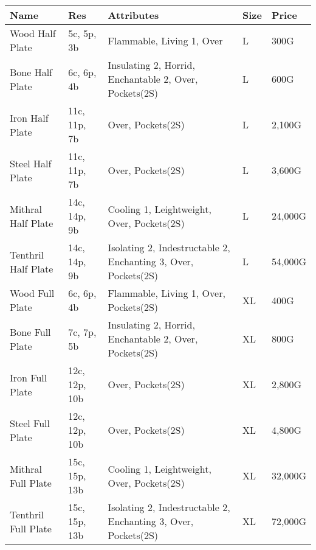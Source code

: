 \begin{longtable}{p{3cm} | p{1.5cm} | p{5cm} | p{1cm} | p{1.5cm}}
	Name & Res &  Attributes & Size & Price\\ \hline
	Wood Half Plate  & 5c, 5p, 3b & Flammable, Living 1, Over & L & 300G\\

	Bone Half Plate  & 6c, 6p, 4b & Insulating 2, Horrid, Enchantable 2, Over, Pockets(2S) & L & 600G\\

	Iron Half Plate  & 11c, 11p, 7b & Over, Pockets(2S) & L & 2,100G\\

	Steel Half Plate  & 11c, 11p, 7b & Over, Pockets(2S) & L & 3,600G\\

	Mithral Half Plate  & 14c, 14p, 9b & Cooling 1, Leightweight, Over, Pockets(2S) & L & 24,000G\\

	Tenthril Half Plate  & 14c, 14p, 9b & Isolating 2, Indestructable 2, Enchanting 3, Over, Pockets(2S) & L & 54,000G\\

	Wood Full Plate  & 6c, 6p, 4b & Flammable, Living 1, Over, Pockets(2S) & XL & 400G\\

	Bone Full Plate  & 7c, 7p, 5b & Insulating 2, Horrid, Enchantable 2, Over, Pockets(2S) & XL & 800G\\

	Iron Full Plate  & 12c, 12p, 10b & Over, Pockets(2S) & XL & 2,800G\\

	Steel Full Plate  & 12c, 12p, 10b & Over, Pockets(2S) & XL & 4,800G\\

	Mithral Full Plate  & 15c, 15p, 13b & Cooling 1, Leightweight, Over, Pockets(2S) & XL & 32,000G\\

	Tenthril Full Plate  & 15c, 15p, 13b & Isolating 2, Indestructable 2, Enchanting 3, Over, Pockets(2S) & XL & 72,000G\\
\end{longtable}
%
%
